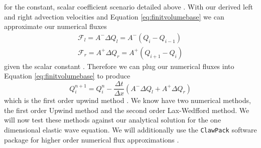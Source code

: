 \documentclass[review,onefignum,onetabnum]{siamart171218}
\begin{document}
for the constant, scalar coefficient scenario detailed above \cite{comp_seis}. With our derived left and right advection velocities and Equation \ref{eq:finitvolumebase} we can approximate our numerical fluxes 
\begin{equation}
    \begin{gathered}
        \mathcal{F}_l = A^{-} \Delta Q_l = A^{-} ( Q_i - Q_{i-1} ) \\
        \mathcal{F}_r = A^{+} \Delta Q_r = A^{+} ( Q_{i+1} - Q_{i} )
    \end{gathered}
\end{equation}
given the scalar constant \cite{comp_seis}. Therefore we can plug our numerical fluxes into Equation \ref{eq:finitvolumebase} to produce 
\begin{equation}
    Q^{n+1}_i = Q^n_i - \frac{\Delta t}{\Delta x} (A^{-} \Delta Q_l + A^{+} \Delta Q_r) 
\end{equation}
which is the first order upwind method \cite{comp_seis,leveque_2002}. We know have two numerical methods, the first order Upwind method and the second order Lax-Wedfford method. We will now test these methods against our analytical solution for the one dimensional elastic wave equation. We will additionally use the \texttt{ClawPack} software package for higher order numerical flux approximations \cite{clawpack}. 
\end{document}
